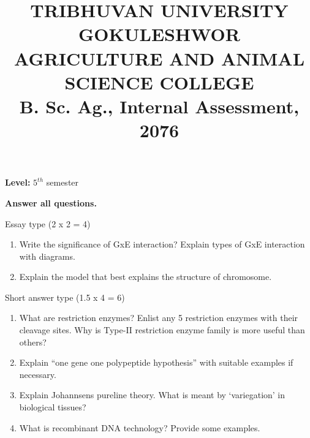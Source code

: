 \documentclass[10pt,]{article}
\title{\vspace{0.25cm} \Large{\textbf{TRIBHUVAN UNIVERSITY}}\\
\vspace{0.20cm} \large{GOKULESHWOR AGRICULTURE AND ANIMAL SCIENCE COLLEGE}\\
\vspace{0.20cm} \large{B. Sc. Ag., Internal Assessment, 2076}}
\author{}
\date{}
\providecommand{\tightlist}{%
  \setlength{\itemsep}{0pt}\setlength{\parskip}{0pt}}
\begin{document}
\maketitle

\begingroup

\hspace{0.5\textwidth}

\par
\endgroup

\begingroup

\hspace{0.5\textwidth}

\par
\endgroup

\textbf{Level:} \(5^{th}\) semester

\textbf{Answer all questions.}

Essay type (2 x 2 = 4)

\begin{enumerate}
\def\labelenumi{\arabic{enumi}.}
\tightlist
\item
  Write the significance of GxE interaction? Explain types of GxE interaction with diagrams.
\item
  Explain the model that best explains the structure of chromosome.
\end{enumerate}

Short answer type (1.5 x 4 = 6)

\begin{enumerate}
\def\labelenumi{\arabic{enumi}.}
\tightlist
\item
  What are restriction enzymes? Enlist any 5 restriction enzymes with their cleavage sites. Why is Type-II restriction enzyme family is more useful than others?
\item
  Explain ``one gene one polypeptide hypothesis'' with suitable examples if necessary.
\item
  Explain Johannsens pureline theory. What is meant by `variegation' in biological tissues?
\item
  What is recombinant DNA technology? Provide some examples.
\end{enumerate}

\vspace{2cm}

\begingroup

\hspace{0.5\textwidth}
\end{document}

